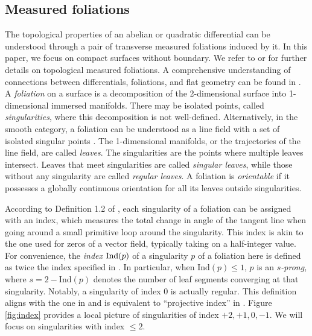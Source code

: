 \documentclass[pdflatex,sn-mathphys]{sn-jnl}%
\numberwithin{equation}{section}
\theoremstyle{thmstyleone}%
\newcommand{\mfoli}{measured foliation}
\newcommand{\SYM}{\textcolor{black}}
\newcommand{\DEF}{\emph}
\begin{document}
\subsection{Measured foliations}
The topological properties of an abelian or quadratic differential can be understood through a pair of transverse \mfoli s induced by it. In this paper, we focus on compact surfaces without boundary. %
We refer to \cite[Expos\'{e} 5]{FLP} or \cite[Section 2]{PapTh07} for further details on topological \mfoli s. A comprehensive understanding of connections between differentials, foliations, and flat geometry can be found in \cite[Chapter 5]{HubbardV1}. 
A \DEF{foliation} on a surface is a decomposition of the 2-dimensional surface into 1-dimensional immersed manifolds. 
There may be isolated points, called \DEF{singularities}, where this decomposition is not well-defined. 
Alternatively, in the smooth category, a foliation can be understood as a line field with a set of isolated singular points \cite[Part Two, Chatper \uppercase\expandafter{}]{Hopf83}.
The 1-dimensional manifolds, or the trajectories of the line field, are called \DEF{leaves}. The singularities are the points where multiple leaves intersect. Leaves that meet singularities are called \DEF{singular leaves}, while those without any singularity are called \DEF{regular leaves}. A foliation is \DEF{orientable} if it possesses a globally continuous orientation for all its leaves outside singularities.

According to Definition 1.2 of \cite[Part Two, Chatper \uppercase\expandafter{}]{Hopf83}, each singularity of a foliation can be assigned with an index, which measures the total change in angle of the tangent line when going around a small primitive loop around the singularity. This index is akin to the one used for zeros of a vector field, typically taking on a half-integer value. %
For convenience, the \DEF{index} $\SYM{\mathrm{Ind}(p)}$ of a singularity $p$ of a foliation here is defined as twice the index specified in \cite{Hopf83}. 
In particular, when $\mathrm{Ind}(p)\leq1$, $p$ is an \DEF{$s$-prong}, where $s=2-\mathrm{Ind}(p)$ denotes the number of leaf segments converging at that singularity. Notably, a singularity of index $0$ is actually regular. This definition aligns with the one in \cite[Expos\'{e} 5]{FLP} and is equivalent to ``projective index'' in \cite{CrGr17}. 
Figure \ref{fig:index} provides a local picture of singularities of index $+2,+1,0,-1$. 
We will focus on singularities with index $\leq2$.
\end{document}
